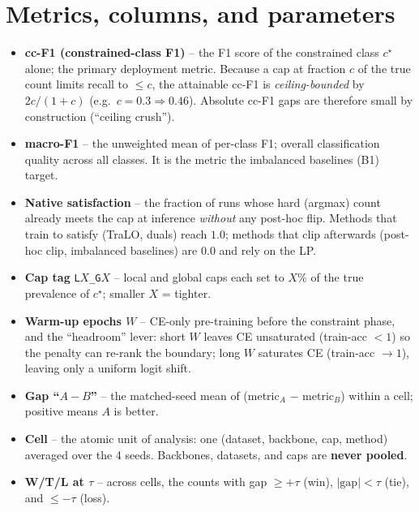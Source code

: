 \documentclass[11pt,a4paper]{article}
\begin{document}
\section{Metrics, columns, and parameters}
\begin{itemize}
\item \textbf{cc-F1 (constrained-class F1)} -- the F1 score of the constrained class $c^\star$ alone; the
primary deployment metric. Because a cap at fraction $c$ of the true count limits recall to $\le c$, the
attainable cc-F1 is \emph{ceiling-bounded} by $2c/(1+c)$ (e.g.\ $c=0.3 \Rightarrow 0.46$). Absolute cc-F1 gaps
are therefore small by construction (``ceiling crush'').
\item \textbf{macro-F1} -- the unweighted mean of per-class F1; overall classification quality across all
classes. It is the metric the imbalanced baselines (B1) target.
\item \textbf{Native satisfaction} -- the fraction of runs whose hard (argmax) count already meets the cap at
inference \emph{without} any post-hoc flip. Methods that train to satisfy (TraLO, duals) reach $1.0$; methods
that clip afterwards (post-hoc clip, imbalanced baselines) are $0.0$ and rely on the LP.
\item \textbf{Cap tag} \texttt{L$X$\_G$X$} -- local and global caps each set to $X\%$ of the true prevalence of
$c^\star$; smaller $X$ = tighter.
\item \textbf{Warm-up epochs $W$} -- CE-only pre-training before the constraint phase, and the ``headroom''
lever: short $W$ leaves CE unsaturated (train-acc $<1$) so the penalty can re-rank the boundary; long $W$
saturates CE (train-acc $\to 1$), leaving only a uniform logit shift.
\item \textbf{Gap ``$A-B$''} -- the matched-seed mean of (metric$_A$ $-$ metric$_B$) within a cell; positive
means $A$ is better.
\item \textbf{Cell} -- the atomic unit of analysis: one (dataset, backbone, cap, method) averaged over the 4
seeds. Backbones, datasets, and caps are \textbf{never pooled}.
\item \textbf{W/T/L at $\tau$} -- across cells, the counts with gap $\ge +\tau$ (win), $|\text{gap}|<\tau$
(tie), and $\le -\tau$ (loss).
\end{itemize}

\end{document}
